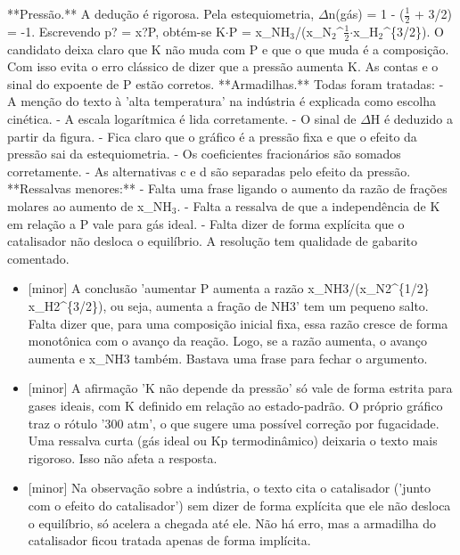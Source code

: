 \documentclass{article}%
\begin{document}
**Pressão.** A dedução é rigorosa. Pela estequiometria, $\Delta$n(gás) = 1 - ($\frac12$ + 3/2) = -1. Escrevendo p? = x?P, obtém{-}se K$\cdot$P = x\_NH$_{3}$/(x\_N$_{2}$\^{}$\frac12$$\cdot$x\_H$_{2}$\^{}\{3/2\}). O candidato deixa claro que K não muda com P e que o que muda é a composição. Com isso evita o erro clássico de dizer que a pressão aumenta K. As contas e o sinal do expoente de P estão corretos.\newline%
\newline%
**Armadilhas.** Todas foram tratadas:\newline%
{-} A menção do texto à 'alta temperatura' na indústria é explicada como escolha cinética.\newline%
{-} A escala logarítmica é lida corretamente.\newline%
{-} O sinal de $\Delta$H é deduzido a partir da figura.\newline%
{-} Fica claro que o gráfico é a pressão fixa e que o efeito da pressão sai da estequiometria.\newline%
{-} Os coeficientes fracionários são somados corretamente.\newline%
{-} As alternativas c e d são separadas pelo efeito da pressão.\newline%
\newline%
**Ressalvas menores:**\newline%
{-} Falta uma frase ligando o aumento da razão de frações molares ao aumento de x\_NH$_{3}$.\newline%
{-} Falta a ressalva de que a independência de K em relação a P vale para gás ideal.\newline%
{-} Falta dizer de forma explícita que o catalisador não desloca o equilíbrio.\newline%
\newline%
A resolução tem qualidade de gabarito comentado.%
\begin{itemize}%
\item%
{[}minor{]} A conclusão 'aumentar P aumenta a razão x\_NH3/(x\_N2\^{}\{1/2\} x\_H2\^{}\{3/2\}), ou seja, aumenta a fração de NH3' tem um pequeno salto. Falta dizer que, para uma composição inicial fixa, essa razão cresce de forma monotônica com o avanço da reação. Logo, se a razão aumenta, o avanço aumenta e x\_NH3 também. Bastava uma frase para fechar o argumento.%
\item%
{[}minor{]} A afirmação 'K não depende da pressão' só vale de forma estrita para gases ideais, com K definido em relação ao estado{-}padrão. O próprio gráfico traz o rótulo '300 atm', o que sugere uma possível correção por fugacidade. Uma ressalva curta (gás ideal ou Kp termodinâmico) deixaria o texto mais rigoroso. Isso não afeta a resposta.%
\item%
{[}minor{]} Na observação sobre a indústria, o texto cita o catalisador ('junto com o efeito do catalisador') sem dizer de forma explícita que ele não desloca o equilíbrio, só acelera a chegada até ele. Não há erro, mas a armadilha do catalisador ficou tratada apenas de forma implícita.%
\end{itemize}%
\end{document}
